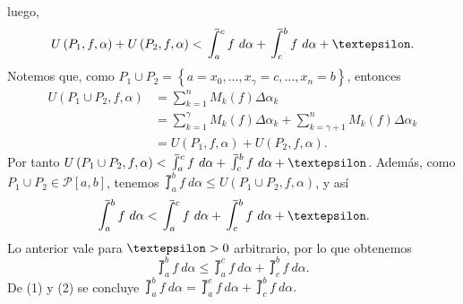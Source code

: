   luego,
  \begin{equation*}
    U\left(P_1,f,\alpha\right)+U\left(P_2,f,\alpha\right) < \upint_a^c f\ d\alpha + \upint_c^b f\ d\alpha + \text{\textepsilon}.
  \end{equation*}
  Notemos que, como $P_1\cup P_2=\left\lbrace a=x_0,\dots, x_\gamma=c,\dots, x_n=b\right\rbrace$, entonces
  \begin{align*}
    U\left(P_1\cup P_2,f,\alpha\right)&=\sum_{k=1}^n M_k\left(f\right)\Delta\alpha_k\\
    &=\sum_{k=1}^\gamma M_k\left(f\right)\Delta\alpha_k + \sum_{k=\gamma+1}^n M_k\left(f\right)\Delta\alpha_k\\
    &=U\left(P_1,f,\alpha\right)+U\left(P_2,f,\alpha\right).
  \end{align*}
  Por tanto $U\left(P_1\cup P_2,f,\alpha\right) < \upint_a^c f\ d\alpha + \upint_c^b f\ d\alpha + \text{\textepsilon}$. Además, como $P_1\cup P_2\in\mathcal{P}\left[a,b\right]$, tenemos $\upint_a^b f\ d\alpha \leq U\left(P_1\cup P_2,f,\alpha\right)$, y así
  \begin{equation*}
    \upint_a^b f\ d\alpha < \upint_a^c f\ d\alpha + \upint_c^b f\ d\alpha +\text{\textepsilon}.
  \end{equation*}
  Lo anterior vale para $\text{\textepsilon}>0$ arbitrario, por lo que obtenemos
  \setcounter{equation}{1}
  \begin{equation}
    \upint_a^b f\ d\alpha \leq \upint_a^c f\ d\alpha + \upint_c^b f\ d\alpha.
  \end{equation}
  De (1) y (2) se concluye $\upint_a^b f\ d\alpha = \upint_a^c f\ d\alpha + \upint_c^b f\ d\alpha.$
